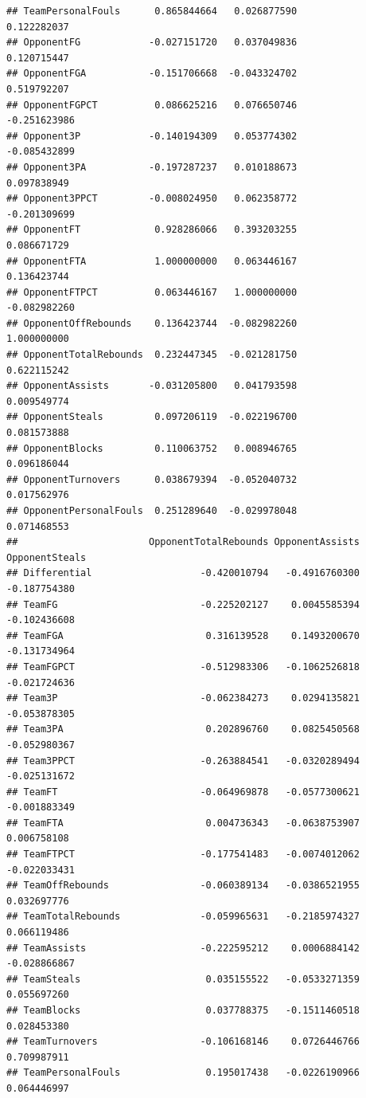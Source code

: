 \documentclass[]{book}
\begin{document}
\begin{verbatim}
## TeamPersonalFouls      0.865844664   0.026877590         0.122282037
## OpponentFG            -0.027151720   0.037049836         0.120715447
## OpponentFGA           -0.151706668  -0.043324702         0.519792207
## OpponentFGPCT          0.086625216   0.076650746        -0.251623986
## Opponent3P            -0.140194309   0.053774302        -0.085432899
## Opponent3PA           -0.197287237   0.010188673         0.097838949
## Opponent3PPCT         -0.008024950   0.062358772        -0.201309699
## OpponentFT             0.928286066   0.393203255         0.086671729
## OpponentFTA            1.000000000   0.063446167         0.136423744
## OpponentFTPCT          0.063446167   1.000000000        -0.082982260
## OpponentOffRebounds    0.136423744  -0.082982260         1.000000000
## OpponentTotalRebounds  0.232447345  -0.021281750         0.622115242
## OpponentAssists       -0.031205800   0.041793598         0.009549774
## OpponentSteals         0.097206119  -0.022196700         0.081573888
## OpponentBlocks         0.110063752   0.008946765         0.096186044
## OpponentTurnovers      0.038679394  -0.052040732         0.017562976
## OpponentPersonalFouls  0.251289640  -0.029978048         0.071468553
##                       OpponentTotalRebounds OpponentAssists OpponentSteals
## Differential                   -0.420010794   -0.4916760300   -0.187754380
## TeamFG                         -0.225202127    0.0045585394   -0.102436608
## TeamFGA                         0.316139528    0.1493200670   -0.131734964
## TeamFGPCT                      -0.512983306   -0.1062526818   -0.021724636
## Team3P                         -0.062384273    0.0294135821   -0.053878305
## Team3PA                         0.202896760    0.0825450568   -0.052980367
## Team3PPCT                      -0.263884541   -0.0320289494   -0.025131672
## TeamFT                         -0.064969878   -0.0577300621   -0.001883349
## TeamFTA                         0.004736343   -0.0638753907    0.006758108
## TeamFTPCT                      -0.177541483   -0.0074012062   -0.022033431
## TeamOffRebounds                -0.060389134   -0.0386521955    0.032697776
## TeamTotalRebounds              -0.059965631   -0.2185974327    0.066119486
## TeamAssists                    -0.222595212    0.0006884142   -0.028866867
## TeamSteals                      0.035155522   -0.0533271359    0.055697260
## TeamBlocks                      0.037788375   -0.1511460518    0.028453380
## TeamTurnovers                  -0.106168146    0.0726446766    0.709987911
## TeamPersonalFouls               0.195017438   -0.0226190966    0.064446997

\end{verbatim}
\end{document}
